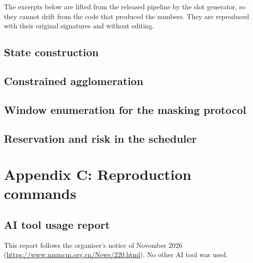 \documentclass{swmcmthesis}
\begin{document}
The excerpts below are lifted from the released pipeline by the slot generator, so
they cannot drift from the code that produced the numbers. They are reproduced with
their original signatures and without editing.

\subsection*{State construction}



\subsection*{Constrained agglomeration}



\subsection*{Window enumeration for the masking protocol}



\subsection*{Reservation and risk in the scheduler}



\section*{Appendix C: Reproduction commands}
\label{app:repro}



\subsection*{AI tool usage report}

This report follows the organiser's notice of November 2026
(\url{https://www.nmmcm.org.cn/News/220.html}). No other AI tool was used.
\end{document}
